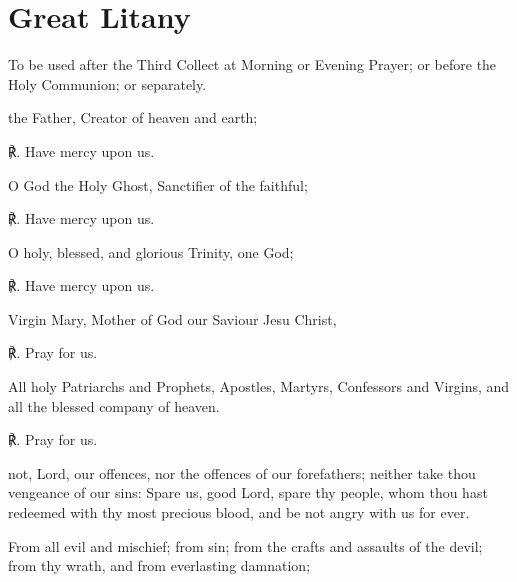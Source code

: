 \label{litany}
\fancyhead[RE,LO]{}
\section{Great Litany}

\vspace{-0.25\baselineskip}

\begin{secrubric}
	{To be used after the Third Collect at Morning or Evening Prayer; or before the Holy Communion; or separately.}
\end{secrubric}

 the Father, Creator of heaven and earth;\par
   ℟. Have mercy upon us.
\par\noindent
   O God the Holy Ghost, Sanctifier of the faithful;

   ℟. Have mercy upon us.
   \par\noindent
   O holy, blessed, and glorious Trinity, one God;
   
   ℟. Have mercy upon us.
   \par\noindent
   Virgin Mary, Mother of God our Saviour Jesu Christ,\par
℟. Pray for us.\par\noindent
  All holy Patriarchs and Prophets, Apostles, Martyrs, Confessors and Virgins, and all the blessed company of heaven.\par
℟. Pray for us.
  \par\noindent
    not, Lord, our offences, nor the offences of our forefathers; neither take thou vengeance of our sins: Spare us, good Lord, spare thy people, whom thou hast redeemed with thy most precious blood, and be not angry with us for ever.\par  
   \par\noindent
    From all evil and mischief; from sin; from the crafts and assaults of the devil; from thy wrath, and from everlasting damnation;
    
